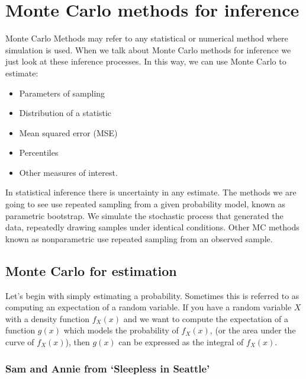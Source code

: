 \documentclass[
]{book}
\providecommand{\tightlist}{%
  \setlength{\itemsep}{0pt}\setlength{\parskip}{0pt}}
\begin{document}
\hypertarget{monte-carlo-methods-for-inference}{%
\chapter{Monte Carlo methods for inference}\label{monte-carlo-methods-for-inference}}

Monte Carlo Methods may refer to any statistical or numerical method where simulation is used. When we talk about Monte Carlo methods for inference we just look at these inference processes. In this way, we can use Monte Carlo to estimate:

\begin{itemize}
\tightlist
\item
  Parameters of sampling
\item
  Distribution of a statistic
\item
  Mean squared error (MSE)
\item
  Percentiles
\item
  Other measures of interest.
\end{itemize}

In statistical inference there is uncertainty in any estimate. The methods we are going to see use repeated sampling from a given probability model, known as parametric bootstrap. We simulate the stochastic process that generated the data, repeatedly drawing samples under identical conditions. Other MC methods known as nonparametric use repeated sampling from an observed sample.

\hypertarget{monte-carlo-for-estimation}{%
\section{Monte Carlo for estimation}\label{monte-carlo-for-estimation}}

Let's begin with simply estimating a probability. Sometimes this is referred to as computing an expectation of a random variable. If you have a random variable \(X\) with a density function \(f_X(x)\) and we want to compute the expectation of a function \(g(x)\) which models the probability of \(f_X(x)\), (or the area under the curve of \(f_X(x)\)), then \(g(x)\) can be expressed as the integral of \(f_X(x)\).

\hypertarget{sam-and-annie-from-sleepless-in-seattle}{%
\subsection{Sam and Annie from `Sleepless in Seattle'}\label{sam-and-annie-from-sleepless-in-seattle}}
\end{document}
